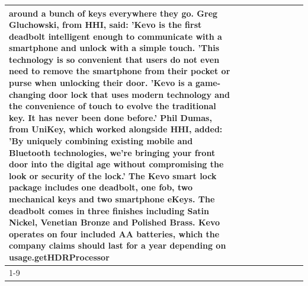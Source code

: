 \begin{table}[H]
\begin{tabular}{lllrlllll}
around a bunch of keys everywhere they go. Greg Gluchowski, from HHI, said: 'Kevo is the first deadbolt intelligent enough to communicate with a smartphone and unlock with a simple touch. 'This technology is so convenient that users do not even need to remove the smartphone from their pocket or purse when unlocking their door. 'Kevo is a game-changing door lock that uses modern technology and the convenience of touch to evolve the traditional key. It has never been done before.' Phil Dumas, from UniKey, which worked alongside HHI, added: 'By uniquely combining existing mobile and Bluetooth technologies, we’re bringing your front door into the digital age without compromising the look or security of the lock.' The Kevo smart lock package includes one deadbolt, one fob, two mechanical keys and two smartphone eKeys. The deadbolt comes in three finishes including Satin Nickel, Venetian Bronze and Polished Brass. Kevo operates on four included AA batteries, which the company claims should last for a year depending on usage.getHDRProcessor \\
\cline{1-9}

\end{tabular}
\end{table}
